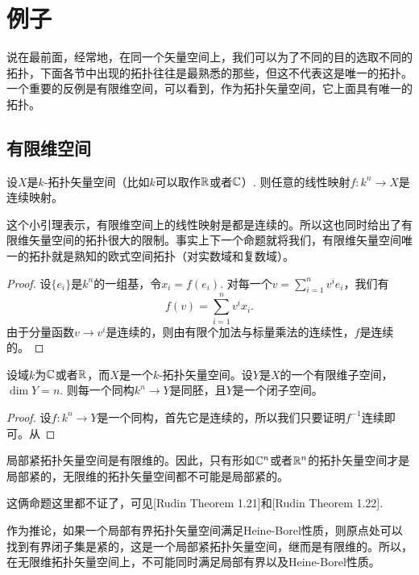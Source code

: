 \chapter{例子}

说在最前面，经常地，在同一个矢量空间上，我们可以为了不同的目的选取不同的拓扑，下面各节中出现的拓扑往往是最熟悉的那些，但这不代表这是唯一的拓扑。一个重要的反例是有限维空间，可以看到，作为拓扑矢量空间，它上面具有唯一的拓扑。

\section{有限维空间}

\begin{lem}
设$X$是$k$-拓扑矢量空间（比如$k$可以取作$\mathbb{R}$或者$\mathbb{C}$）. 则任意的线性映射$f:k^n\to X$是连续映射。
\end{lem}

这个小引理表示，有限维空间上的线性映射是都是连续的。所以这也同时给出了有限维矢量空间的拓扑很大的限制。事实上下一个命题就将我们，有限维矢量空间唯一的拓扑就是熟知的欧式空间拓扑（对实数域和复数域）。

\begin{proof}
设$\{e_i\}$是$k^n$的一组基，令$x_i=f(e_i)$. 对每一个$v=\sum_{i=1}^nv^ie_i$，我们有
\[
	f(v)=\sum_{i=1}^nv^ix_i.
\]
由于分量函数$v\to v^i$是连续的，则由有限个加法与标量乘法的连续性，$f$是连续的。
\end{proof}

\begin{pro}
	设域$k$为$\mathbb{C}$或者$\mathbb{R}$，而$X$是一个$k$-拓扑矢量空间。设$Y$是$X$的一个有限维子空间，$\dim Y=n$. 则每一个同构$k^n\to Y$是同胚，且$Y$是一个闭子空间。
\end{pro}

\begin{proof}
	设$f:k^n\to Y$是一个同构，首先它是连续的，所以我们只要证明$f^{-1}$连续即可。从
\end{proof}

\begin{pro}\label{1.46}
局部紧拓扑矢量空间是有限维的。因此，只有形如$\mathbb{C}^n$或者$\mathbb{R}^n$的拓扑矢量空间才是局部紧的，无限维的拓扑矢量空间都不可能是局部紧的。
\end{pro}

这俩命题这里都不证了，可见[Rudin Theorem 1.21]和[Rudin Theorem 1.22].

作为推论，如果一个局部有界拓扑矢量空间满足Heine-Borel性质，则原点处可以找到有界闭子集是紧的，这是一个局部紧拓扑矢量空间，继而是有限维的。所以，在无限维拓扑矢量空间上，不可能同时满足局部有界以及Heine-Borel性质。

